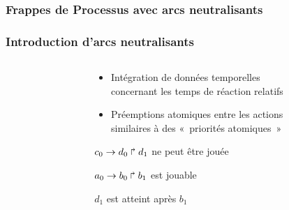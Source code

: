 
\begin{frame}[c]
  \frametitle{Frappes de Processus avec arcs neutralisants}


\end{frame}



\begin{frame}[c]
  \frametitle{Introduction d'arcs neutralisants}

\begin{columns}
\begin{column}{.4\textwidth}


\end{column}
\begin{column}{.55\textwidth}
\begin{center}

\begin{itemize}
  \item Intégration de données temporelles\\
    concernant les temps de réaction relatifs
  \item Préemptions atomiques entre les actions\\
    similaires à des «~priorités atomiques~»
\end{itemize}

\vspace*{1cm}
$c_0\rightarrow d_0\Rsh d_1$ ne peut être jouée 

\bigskip
$a_0\rightarrow b_0\Rsh b_1$ est jouable

\bigskip
\f $d_1$ est  atteint après $b_1$

\end{center}
\end{column}
\end{columns}


\end{frame}
